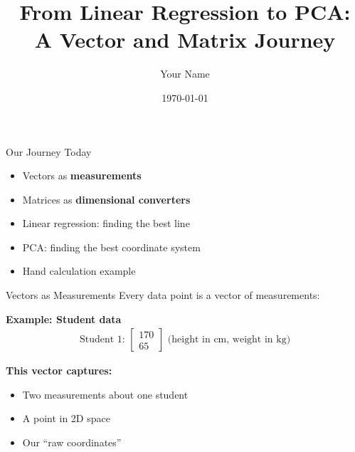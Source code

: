 \documentclass[aspectratio=169]{beamer}
\title{From Linear Regression to PCA: \\A Vector and Matrix Journey}
\author{Your Name}
\date{\today}
\begin{document}
\frame{\titlepage}

\begin{frame}{Our Journey Today}
\begin{itemize}
    \item Vectors as \textbf{measurements}
    \item Matrices as \textbf{dimensional converters}
    \item Linear regression: finding the best line
    \item PCA: finding the best coordinate system
    \item Hand calculation example
\end{itemize}
\end{frame}

\begin{frame}{Vectors as Measurements}
Every data point is a vector of measurements:

\vspace{1em}
\textbf{Example: Student data}
\begin{align}
\text{Student 1: } \begin{bmatrix} 170 \\ 65 \end{bmatrix} \text{ (height in cm, weight in kg)}
\end{align}

\vspace{1em}
\textbf{This vector captures:}
\begin{itemize}
    \item Two measurements about one student
    \item A point in 2D space
    \item Our ``raw coordinates''
\end{itemize}
\end{frame}
\end{document}

